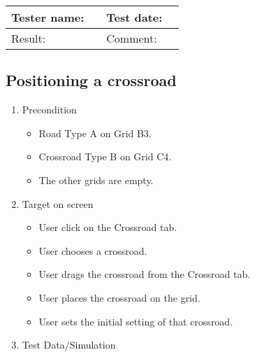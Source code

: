 \begin{tabularx}{\textwidth}{|p{3cm}X|p{3cm}X|}\hline
	Tester name: &  & Test date: & \\\hline
	Result: &   \pass & Comment: & \\\hline
\end{tabularx}

\newpage

\subsection{Positioning a crossroad}

\begin{enumerate}
	\item Precondition
	\begin{itemize}
		\item Road Type A on Grid B3.
		\item Crossroad Type B on Grid C4. 
		\item The other grids are empty. 		
	\end{itemize}

	\item Target on screen
	\begin{itemize}
		\item User click on the Crossroad tab.
		\item User chooses a crossroad.
		\item User drags the crossroad from the Crossroad tab.
		\item User places the crossroad on the grid.
		\item User sets the initial setting of that crossroad.
	\end{itemize}
	\item Test Data/Simulation
\end{enumerate}	
